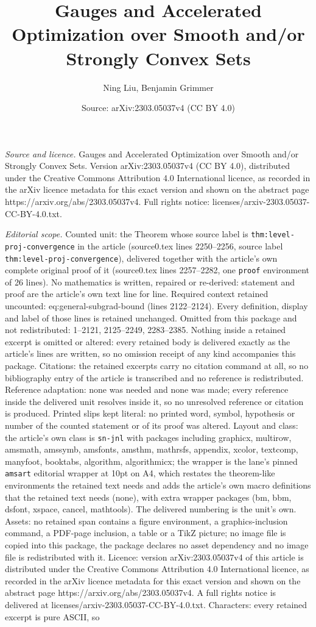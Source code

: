 \documentclass[10pt,a4paper]{amsart}
\title[Gauges and Accelerated Optimization over Smooth and/or Stron]{Gauges and Accelerated Optimization over Smooth and/or Strongly Convex Sets}
\author{Ning Liu, Benjamin Grimmer}
\date{Source: arXiv:2303.05037v4 (CC BY 4.0)}
\begin{document}
\maketitle

\noindent\emph{Source and licence.} Gauges and Accelerated Optimization over Smooth and/or Strongly Convex Sets. Version arXiv:2303.05037v4 (CC BY 4.0), distributed under the Creative Commons Attribution 4.0 International licence, as recorded in the arXiv licence metadata for this exact version and shown on the abstract page https://arxiv.org/abs/2303.05037v4. Full rights notice: licenses/arxiv-2303.05037-CC-BY-4.0.txt.\par\smallskip

\noindent\textit{Editorial scope.} Counted unit: the Theorem whose source label is \texttt{thm:level-proj-convergence} in the article (source0.tex lines 2250--2256, source label \texttt{thm:level-proj-convergence}), delivered together with the article's own complete original proof of it (source0.tex lines 2257--2282, one \texttt{proof} environment of 26 lines). No mathematics is written, repaired or re-derived: statement and proof are the article's own text line for line. Required context retained uncounted: eq:general-subgrad-bound (lines 2122--2124). Every definition, display and label of those lines is retained unchanged. Omitted from this package and not redistributed: 1--2121, 2125--2249, 2283--2385. Nothing inside a retained excerpt is omitted or altered: every retained body is delivered exactly as the article's lines are written, so no omission receipt of any kind accompanies this package. Citations: the retained excerpts carry no citation command at all, so no bibliography entry of the article is transcribed and no reference is redistributed. Reference adaptation: none was needed and none was made; every reference inside the delivered unit resolves inside it, so no unresolved reference or citation is produced. Printed slips kept literal: no printed word, symbol, hypothesis or number of the counted statement or of its proof was altered. Layout and class: the article's own class is \texttt{sn-jnl} with packages including graphicx, multirow, amsmath, amssymb, amsfonts, amsthm, mathrsfs, appendix, xcolor, textcomp, manyfoot, booktabs, algorithm, algorithmicx; the wrapper is the lane's pinned \texttt{amsart} editorial wrapper at 10pt on A4, which restates the theorem-like environments the retained text needs and adds the article's own macro definitions that the retained text needs (none), with extra wrapper packages (bm, bbm, dsfont, xspace, cancel, mathtools). The delivered numbering is the unit's own. Assets: no retained span contains a figure environment, a graphics-inclusion command, a PDF-page inclusion, a table or a TikZ picture; no image file is copied into this package, the package declares no asset dependency and no image file is redistributed with it. Licence: version arXiv:2303.05037v4 of this article is distributed under the Creative Commons Attribution 4.0 International licence, as recorded in the arXiv licence metadata for this exact version and shown on the abstract page https://arxiv.org/abs/2303.05037v4. A full rights notice is delivered at licenses/arxiv-2303.05037-CC-BY-4.0.txt. Characters: every retained excerpt is pure ASCII, so 
\end{document}
